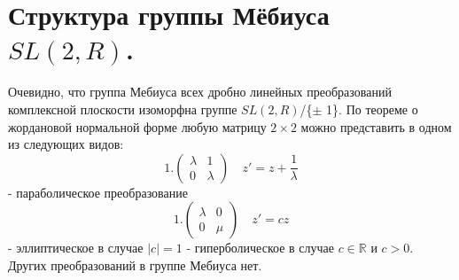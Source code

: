 \documentclass[12pt]{article}
\theoremstyle{definition}
\begin{document}
  \section{Структура группы Мёбиуса $SL(2,R)$.}
  Очевидно, что группа Мебиуса всех дробно линейных преобразований комплексной плоскости изоморфна группе $SL(2,R)$/\{$\pm$ 1\}. По теореме о жордановой нормальной форме любую матрицу $2\times2$ можно представить в одном из следующих видов:
 \begin{equation}
 1.
\begin{pmatrix}
\lambda & 1\\
0 & \lambda
\end{pmatrix}
\quad z'= z + \frac{1}{\lambda}
\end{equation}
- параболическое преобразование
 \begin{equation}
 1.
\begin{pmatrix}
\lambda & 0\\
0 & \mu
\end{pmatrix}
\quad z'= cz
\end{equation}
- эллиптическое в случае $|c|=1$
- гиперболическое в случае $ c \in\mathbb{R}$ и $c>0$. 
Других преобразований в группе Мебиуса нет.
\end{document}
